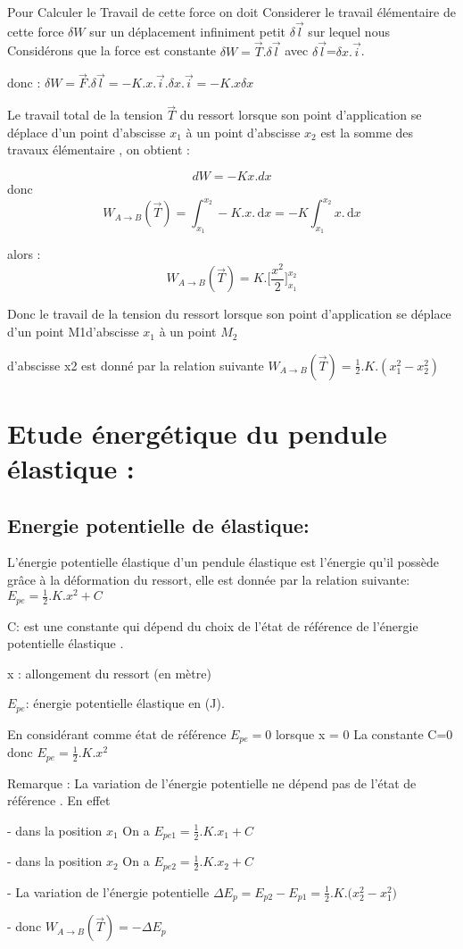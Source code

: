 \documentclass[12pt]{article}
\begin{document}
Pour Calculer le Travail de cette force on doit Considerer le travail élémentaire de cette force $\delta{W}$ sur un déplacement infiniment petit $\delta{\vec{l}}$ sur lequel nous Considérons que la force est constante $\delta{W} =  \vec{T}.\delta{\vec{l}}$ avec $\delta{\vec{l}}$=$\delta{x}.\vec{i}$.

donc : $\delta{W} = \vec{F}.\delta{\vec{l}} = -K.x.\vec{i}.\delta{x}.\vec{i} = -K.x\delta{x} $ 

Le travail total de la tension $\vec{T}$ du ressort lorsque son point d'application se déplace d'un point
d'abscisse $x_1$ à un point d'abscisse $x_2$ est la somme des travaux élémentaire , on obtient : 

$$dW = -Kx.dx$$
donc $$ W_{A \rightarrow B}(\vec{T})   = \int_{x_1}^{x_2} -K.x.\,\mathrm{d}x = -K\int_{x_1}^{x_2} x.\,\mathrm{d}x
$$

alors :$$ W_{A \rightarrow B}(\vec{T})= K.\big[ \frac{x^2}{2}\big]_{x_1}^{x_2}$$ 

Donc le travail de la tension du ressort lorsque son point d'application se déplace d'un point M1d'abscisse $x_1$ à un point $M_2$ 

d'abscisse x2 est donné par la relation suivante $ W_{A \rightarrow B}(\vec{T}) = \frac{1}{2}.K.(x_1^2 - x_2^2) $


\section{Etude énergétique du pendule élastique :}

\subsection{Energie potentielle de élastique:}

L'énergie potentielle élastique d'un pendule élastique est l'énergie qu'il possède grâce à la déformation du ressort, elle est donnée par la relation suivante:  $E_{pe} = \frac{1}{2}.K.x^2 + C$

C: est une constante qui dépend du choix de l’état de référence de l’énergie potentielle élastique .

x : allongement du ressort (en mètre)

$E_{pe}$: énergie potentielle élastique en (J).

En considérant comme état de référence $E_{pe} = 0$ lorsque x = 0 La constante C=0 donc $E_{pe} = \frac{1}{2}.K.x^2$

\begin{tcolorbox}
Remarque : La variation de l'énergie potentielle ne dépend pas de l'état de référence . En effet 

- dans la position $x_1$ On a $E_{pe1} = \frac{1}{2}.K.x_1 + C$


- dans la position $x_2$ On a $E_{pe2} = \frac{1}{2}.K.x_2 + C$

- La variation de l’énergie potentielle $\Delta{E_p}=E_{p2}-E_{p1} = \frac{1}{2}.K.\big(x_2^2 - x_1^2\big)$

- donc $W_{A \rightarrow B}(\vec{T}) = - \Delta{E_p}$
\end{tcolorbox}
\end{document}
